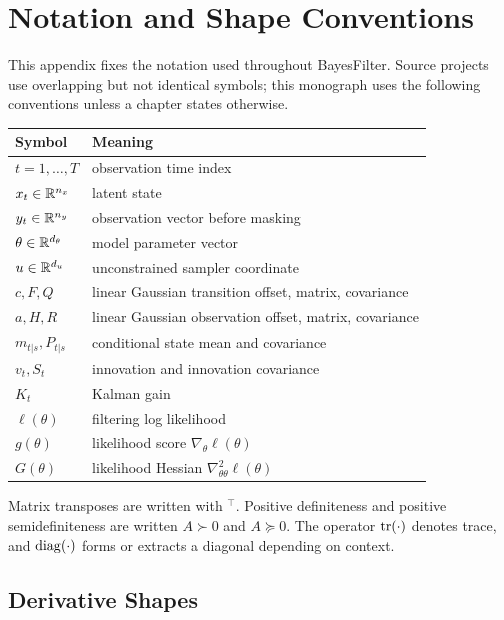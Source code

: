 \chapter{Notation and Shape Conventions}
\label{app:bf-notation}

This appendix fixes the notation used throughout BayesFilter.  Source projects
use overlapping but not identical symbols; this monograph uses the following
conventions unless a chapter states otherwise.

\begin{center}
\begin{tabular}{ll}
\toprule
Symbol & Meaning \\
\midrule
$t=1,\ldots,T$ & observation time index \\
$x_t \in \mathbb{R}^{n_x}$ & latent state \\
$y_t \in \mathbb{R}^{n_y}$ & observation vector before masking \\
$\theta \in \mathbb{R}^{d_\theta}$ & model parameter vector \\
$u \in \mathbb{R}^{d_u}$ & unconstrained sampler coordinate \\
$c,F,Q$ & linear Gaussian transition offset, matrix, covariance \\
$a,H,R$ & linear Gaussian observation offset, matrix, covariance \\
$m_{t|s},P_{t|s}$ & conditional state mean and covariance \\
$v_t,S_t$ & innovation and innovation covariance \\
$K_t$ & Kalman gain \\
$\ell(\theta)$ & filtering log likelihood \\
$g(\theta)$ & likelihood score $\nabla_\theta \ell(\theta)$ \\
$G(\theta)$ & likelihood Hessian $\nabla^2_{\theta\theta}\ell(\theta)$ \\
\bottomrule
\end{tabular}
\end{center}

Matrix transposes are written with ${}^\top$.  Positive definiteness and
positive semidefiniteness are written $A \succ 0$ and $A \succeq 0$.  The
operator $\operatorname{tr}(\cdot)$ denotes trace, and $\operatorname{diag}(\cdot)$ forms or extracts a
diagonal depending on context.

\section{Derivative Shapes}
\label{sec:bf-derivative-shapes}

